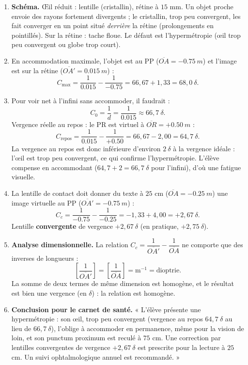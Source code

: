 \documentclass[11pt]{article}
\newcommand{\cle}[1]{{\popxbold\color{popdark}#1}}
\begin{document}
\begin{corrige}
\begin{enumerate}
\item \textbf{Schéma.} Œil réduit : lentille (cristallin), rétine à $15$ mm. Un objet proche envoie des rayons fortement divergents ; le cristallin, trop peu convergent, les fait converger en un point situé \emph{derrière} la rétine (prolongements en pointillés). Sur la rétine : tache floue. Le défaut est l'\cle{hypermétropie} (œil trop peu convergent ou globe trop court).
\item En accommodation maximale, l'objet est au PP ($\overline{OA} = -\SI{0,75}{m}$) et l'image est sur la rétine ($\overline{OA'} = \SI{0,015}{m}$) :
\[ C_{\max} = \frac{1}{\num{0,015}} - \frac{1}{-\num{0,75}} = 66,67 + 1,33 = 68,0\ \delta. \]
\item Pour voir net à l'infini sans accommoder, il faudrait :
\[ C_0 = \frac{1}{d} = \frac{1}{\num{0,015}} \approx 66,7\ \delta. \]
Vergence réelle au repos : le PR est virtuel à $\overline{OR} = +\SI{0,50}{m}$ :
\[ C_{\text{repos}} = \frac{1}{\num{0,015}} - \frac{1}{+\num{0,50}} = 66,67 - 2,00 = 64,7\ \delta. \]
La vergence au repos est donc inférieure d'environ $2\ \delta$ à la vergence idéale : l'œil est trop peu convergent, ce qui confirme l'hypermétropie. L'élève compense en accommodant ($64,7 + 2 = 66,7\ \delta$ pour l'infini), d'où une fatigue visuelle.
\item La lentille de contact doit donner du texte à $25$ cm ($\overline{OA} = -\SI{0,25}{m}$) une image virtuelle au PP ($\overline{OA'} = -\SI{0,75}{m}$) :
\[ C_c = \frac{1}{-\num{0,75}} - \frac{1}{-\num{0,25}} = -1,33 + 4,00 = +2,67\ \delta. \]
Lentille \textbf{convergente} de vergence $+2,67\ \delta$ (en pratique, $+2,75\ \delta$).
\item \textbf{Analyse dimensionnelle.} La relation $C_c = \dfrac{1}{\overline{OA'}} - \dfrac{1}{\overline{OA}}$ ne comporte que des inverses de longueurs :
\[ \left[\frac{1}{\overline{OA'}}\right] = \left[\frac{1}{\overline{OA}}\right] = \text{m}^{-1} = \text{dioptrie}. \]
La somme de deux termes de même dimension est homogène, et le résultat est bien une vergence (en $\delta$) : la relation est homogène.
\item \textbf{Conclusion pour le carnet de santé.} « L'élève présente une hypermétropie : son œil, trop peu convergent (vergence au repos $64,7\ \delta$ au lieu de $66,7\ \delta$), l'oblige à accommoder en permanence, même pour la vision de loin, et son punctum proximum est reculé à $75$ cm. Une correction par lentilles convergentes de vergence $+2,67\ \delta$ est prescrite pour la lecture à $25$ cm. Un suivi ophtalmologique annuel est recommandé. »

\end{enumerate}
\end{corrige}
\end{document}
